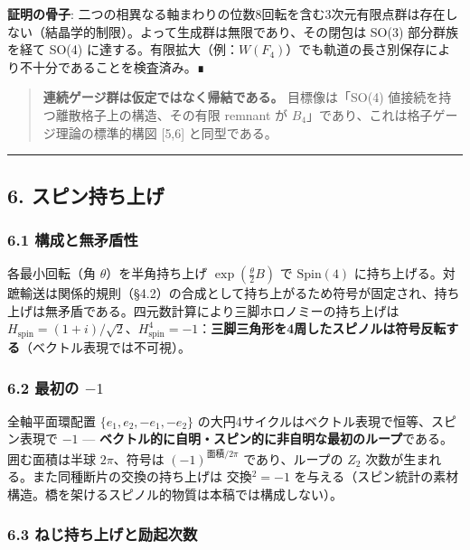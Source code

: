 \documentclass[
]{ltjsarticle}
\begin{document}
\textbf{証明の骨子}:
二つの相異なる軸まわりの位数8回転を含む3次元有限点群は存在しない（結晶学的制限）。よって生成群は無限であり、その閉包は
SO(3) 部分群族を経て SO(4)
に達する。有限拡大（例：\(W(F_4)\)）でも軌道の長さ別保存により不十分であることを検査済み。∎

\begin{quote}
\textbf{連続ゲージ群は仮定ではなく帰結である。} 目標像は「SO(4)
値接続を持つ離散格子上の構造、その有限 remnant が
\(B_4\)」であり、これは格子ゲージ理論の標準的構図 {[}5,6{]}
と同型である。
\end{quote}

\begin{center}\rule{0.5\linewidth}{0.5pt}\end{center}

\subsection{6.
スピン持ち上げ}\label{ux30b9ux30d4ux30f3ux6301ux3061ux4e0aux3052}

\subsubsection{6.1
構成と無矛盾性}\label{ux69cbux6210ux3068ux7121ux77dbux76feux6027}

各最小回転（角 \(\theta\)）を半角持ち上げ \(\exp(\tfrac\theta2 B)\) で
\(\mathrm{Spin}(4)\)
に持ち上げる。対蹠輸送は関係的規則（§4.2）の合成として持ち上がるため符号が固定され、持ち上げは無矛盾である。四元数計算により三脚ホロノミーの持ち上げは
\(H_{\mathrm{spin}}=(1+i)/\sqrt2\)、\(H_{\mathrm{spin}}^4=-1\)：\textbf{三脚三角形を4周したスピノルは符号反転する}（ベクトル表現では不可視）。

\subsubsection{\texorpdfstring{6.2 最初の
\(-1\)}{6.2 最初の -1}}\label{ux6700ux521dux306e--1}

全軸平面環配置 \(\{e_1,e_2,-e_1,-e_2\}\)
の大円4サイクルはベクトル表現で恒等、スピン表現で \(-1\) ---
\textbf{ベクトル的に自明・スピン的に非自明な最初のループ}である。囲む面積は半球
\(2\pi\)、符号は \((-1)^{\text{面積}/2\pi}\) であり、ループの \(Z_2\)
次数が生まれる。また同種断片の交換の持ち上げは 交換\(^2=-1\)
を与える（スピン統計の素材構造。橋を架けるスピノル的物質は本稿では構成しない）。

\subsubsection{6.3
ねじ持ち上げと励起次数}\label{ux306dux3058ux6301ux3061ux4e0aux3052ux3068ux52b1ux8d77ux6b21ux6570}
\end{document}
